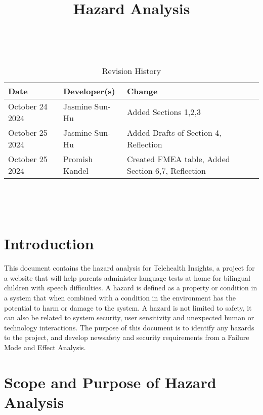 \documentclass{article}
\title{Hazard Analysis\\\progname}
\author{\authname}
\date{}
\begin{document}
\maketitle
\thispagestyle{empty}

~\newpage


\begin{table}[hp]
\caption{Revision History} \label{TblRevisionHistory}
\begin{tabularx}{\textwidth}{llX}
\toprule
\textbf{Date} & \textbf{Developer(s)} & \textbf{Change}\\
\midrule
October 24 2024 & Jasmine Sun-Hu & Added Sections 1,2,3\\
October 25 2024 & Jasmine Sun-Hu & Added Drafts of Section 4, Reflection\\
October 25 2024 & Promish Kandel & Created FMEA table, Added Section 6,7, Reflection\\
\bottomrule
\end{tabularx}
\end{table}

~\newpage

\tableofcontents

~\newpage


\section{Introduction}

\hspace{1.5em} This document contains the hazard analysis for Telehealth Insights, a project for a website that will help 
parents administer language tests at home for bilingual children with speech difficulties. A hazard is defined as a 
property or condition in a system that when combined with a condition in the environment has the potential to harm or 
damage to the system. A hazard is not limited to safety, it can also be related to system security, user sensitivity and 
unexpected human or technology interactions. The purpose of this document is to identify any hazards to the project, and 
develop newsafety and security requirements from a Failure Mode and Effect Analysis.

\section{Scope and Purpose of Hazard Analysis}
\end{document}
